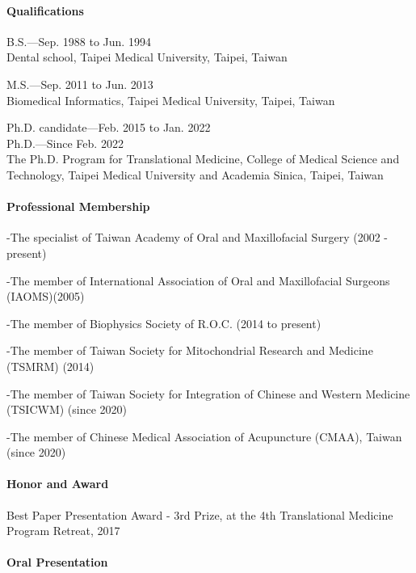 \begin{vita}
\paragraph*{Qualifications}

B.S.---Sep. 1988 to Jun. 1994\\
Dental school, Taipei Medical University, Taipei, Taiwan

M.S.---Sep. 2011 to Jun. 2013\\
Biomedical Informatics, Taipei Medical University, Taipei, Taiwan

Ph.D. candidate---Feb. 2015 to Jan. 2022\\
\indent Ph.D.---Since Feb. 2022\\
The Ph.D. Program for Translational Medicine, College of Medical Science and Technology, Taipei Medical University and Academia Sinica, Taipei, Taiwan

\pagebreak

\paragraph*{Professional Membership}

-The specialist of Taiwan Academy of Oral and Maxillofacial Surgery (2002 - present)

-The member of International Association of Oral and Maxillofacial Surgeons (IAOMS)(2005)

-The member of Biophysics Society of R.O.C. (2014 to present)

-The member of Taiwan Society for Mitochondrial Research and Medicine (TSMRM) (2014)

-The member of Taiwan Society for Integration of Chinese and Western Medicine (TSICWM) (since 2020)

-The member of Chinese Medical Association of Acupuncture (CMAA), Taiwan (since 2020)

\paragraph*{Honor and Award}
Best Paper Presentation Award - 3rd Prize, at the 4th Translational Medicine Program Retreat, 2017


\paragraph*{Oral Presentation}
\begin{outline}



\end{outline}
\end{vita}
